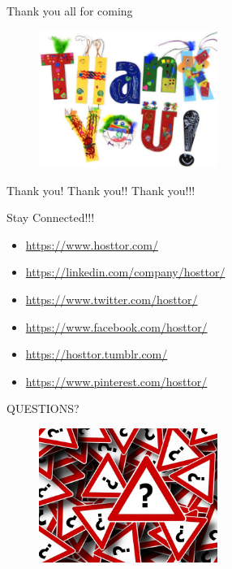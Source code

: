 \documentclass[english,12pt,presentation]{beamer}
\begin{document}
\begin{frame}{Thank you all for coming}
\begin{figure}
\centering
\includegraphics[width=220]{images/thanks.png}
\end{figure}
\item Thank you! Thank you!! Thank you!!!
\end{frame}

\begin{frame}{Stay Connected!!!}
\begin{itemize}
\item \url{https://www.hosttor.com/}
\item \url{https://linkedin.com/company/hosttor/}
\item \url{https://www.twitter.com/hosttor/}
\item \url{https://www.facebook.com/hosttor/}
\item \url{https://hosttor.tumblr.com/}
\item \url{https://www.pinterest.com/hosttor/}
\end{itemize}
\end{frame}

\begin{frame}{QUESTIONS?}
\begin{figure}
\centering
\includegraphics[width=220]{images/q.png}
\end{figure}
\end{frame}
\end{document}

